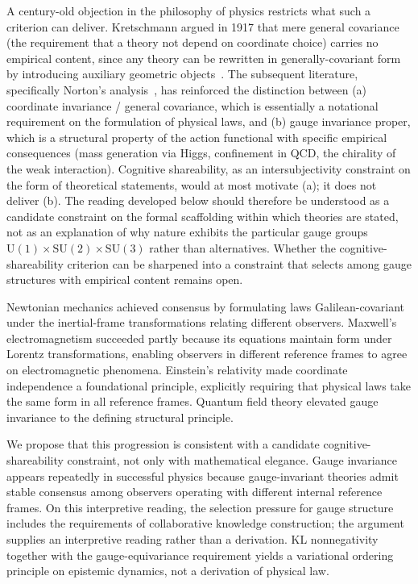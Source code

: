 \documentclass[11pt]{article}
\begin{document}
A century-old objection in the philosophy of physics restricts what such a criterion can deliver. Kretschmann argued in 1917 that mere general covariance (the requirement that a theory not depend on coordinate choice) carries no empirical content, since any theory can be rewritten in generally-covariant form by introducing auxiliary geometric objects~\cite{Kretschmann1917}. The subsequent literature, specifically Norton's analysis~\cite{Norton1993}, has reinforced the distinction between (a) coordinate invariance / general covariance, which is essentially a notational requirement on the formulation of physical laws, and (b) gauge invariance proper, which is a structural property of the action functional with specific empirical consequences (mass generation via Higgs, confinement in QCD, the chirality of the weak interaction). Cognitive shareability, as an intersubjectivity constraint on the form of theoretical statements, would at most motivate (a); it does not deliver (b). The reading developed below should therefore be understood as a candidate constraint on the formal scaffolding within which theories are stated, not as an explanation of why nature exhibits the particular gauge groups $\mathrm{U}(1) \times \mathrm{SU}(2) \times \mathrm{SU}(3)$ rather than alternatives. Whether the cognitive-shareability criterion can be sharpened into a constraint that selects among gauge structures with empirical content remains open.

Newtonian mechanics achieved consensus by formulating laws Galilean-covariant under the inertial-frame transformations relating different observers. Maxwell's electromagnetism succeeded partly because its equations maintain form under Lorentz transformations, enabling observers in different reference frames to agree on electromagnetic phenomena. Einstein's relativity made coordinate independence a foundational principle, explicitly requiring that physical laws take the same form in all reference frames. Quantum field theory elevated gauge invariance to the defining structural principle.

We propose that this progression is consistent with a candidate cognitive-shareability constraint, not only with mathematical elegance. Gauge invariance appears repeatedly in successful physics because gauge-invariant theories admit stable consensus among observers operating with different internal reference frames. On this interpretive reading, the selection pressure for gauge structure includes the requirements of collaborative knowledge construction; the argument supplies an interpretive reading rather than a derivation. KL nonnegativity together with the gauge-equivariance requirement yields a variational ordering principle on epistemic dynamics, not a derivation of physical law.
\end{document}
